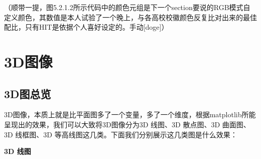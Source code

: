 \documentclass[12pt]{article}
\begin{document}
（顺带一提，图5.2.1.2所示代码中的颜色元组是下一个section要说的RGB模式自定义颜色，其数值是本人试验了一个晚上，与各高校校徽颜色反复比对出来的最佳配比，只有HIT是依据个人喜好设定的。手动[doge]）


\newpage
\section{3D图像}
\subsection{3D图总览}
3D图像，本质上就是比平面图多了一个变量，多了一个维度，根据matplotlib所能呈现出的效果，我们可以大致将3D图像分为3D 线图、3D 散点图、3D 曲面图、3D 线框图、3D 等高线图这几类。下面我们分别展示这几类图是什么效果：

\textbf{\Large 3D 线图}
\end{document}

